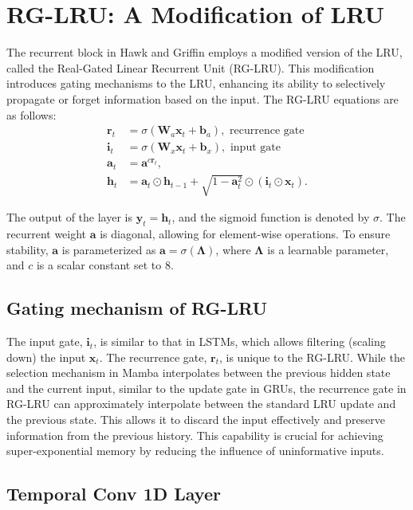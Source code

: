 \documentclass[12pt,a4paper]{report}
\begin{document}
\section{RG-LRU: A Modification of LRU}

The recurrent block in Hawk and Griffin employs a modified version of the LRU, called the Real-Gated Linear Recurrent Unit (RG-LRU). This modification introduces gating mechanisms to the LRU, enhancing its ability to selectively propagate or forget information based on the input. The RG-LRU equations are as follows:
\[
\begin{aligned}
\mathbf{r}_t &= \sigma(\mathbf{W}_a \mathbf{x}_t + \mathbf{b}_a), \text{ recurrence gate}\\
\mathbf{i}_t &= \sigma(\mathbf{W}_x \mathbf{x}_t + \mathbf{b}_x), \text{ input gate} \\
\mathbf{a}_t &= \mathbf{a}^{c \mathbf{r}_t}, \\
\mathbf{h}_t &= \mathbf{a}_t \odot \mathbf{h}_{t-1} + \sqrt{1 - \mathbf{a}_t^2} \odot (\mathbf{i}_t \odot \mathbf{x}_t).
\end{aligned}
\]

The output of the layer is $\mathbf{y}_t = \mathbf{h}_t$, and the sigmoid function is denoted by $\sigma$. The recurrent weight $\mathbf{a}$ is diagonal, allowing for element-wise operations. To ensure stability, $\mathbf{a}$ is parameterized as $\mathbf{a} = \sigma(\mathbf{\Lambda})$, where $\mathbf{\Lambda}$ is a learnable parameter, and $c$ is a scalar constant set to $8$.

\subsection{Gating mechanism of RG-LRU}
The input gate, $\mathbf{i}_t$, is similar to that in LSTMs, which allows filtering (scaling down) the input $\mathbf{x}_t$. The recurrence gate, $\mathbf{r}_t$, is unique to the RG-LRU. While the selection mechanism in Mamba \cite{mamba} interpolates between the previous hidden state and the current input, similar to the update gate in GRUs, the recurrence gate in RG-LRU can approximately interpolate between the standard LRU update and the previous state. This allows it to discard the input effectively and preserve information from the previous history. This capability is crucial for achieving super-exponential memory by reducing the influence of uninformative inputs.

\subsection{Temporal Conv 1D Layer}
\end{document}
